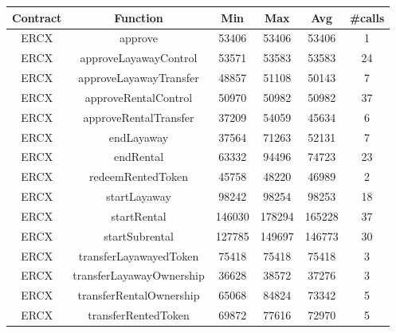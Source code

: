 \documentclass[english, LaM, oneside]{sapthesis}%
\begin{document}
\begin{table}
\centering
\begin{adjustbox}{width=0.75\textwidth}
\small
\begin{tabular}{@{}cccccc@{}}
\toprule
\textbf{Contract}  & \textbf{Function}            & \textbf{Min} & \textbf{Max} & \textbf{Avg} & \textbf{\#calls} \\ \midrule
ERCX               & approve                      & 53406        & 53406        & 53406        & 1                \\
ERCX               & approveLayawayControl        & 53571        & 53583        & 53583        & 24               \\
ERCX               & approveLayawayTransfer       & 48857        & 51108        & 50143        & 7                \\
ERCX               & approveRentalControl         & 50970        & 50982        & 50982        & 37               \\
ERCX               & approveRentalTransfer        & 37209        & 54059        & 45634        & 6                \\
ERCX               & endLayaway                   & 37564        & 71263        & 52131        & 7                \\
ERCX               & endRental                    & 63332        & 94496        & 74723        & 23               \\
ERCX               & redeemRentedToken            & 45758        & 48220        & 46989        & 2                \\
ERCX               & startLayaway                 & 98242        & 98254        & 98253        & 18               \\
ERCX               & startRental                  & 146030       & 178294       & 165228       & 37               \\
ERCX               & startSubrental               & 127785       & 149697       & 146773       & 30               \\
ERCX               & transferLayawayedToken       & 75418        & 75418        & 75418        & 3                \\
ERCX               & transferLayawayOwnership     & 36628        & 38572        & 37276        & 3                \\
ERCX               & transferRentalOwnership      & 65068        & 84824        & 73342        & 5                \\
ERCX               & transferRentedToken          & 69872        & 77616        & 72970        & 5                \\

\end{tabular}
\end{adjustbox}
\end{table}
\end{document}
